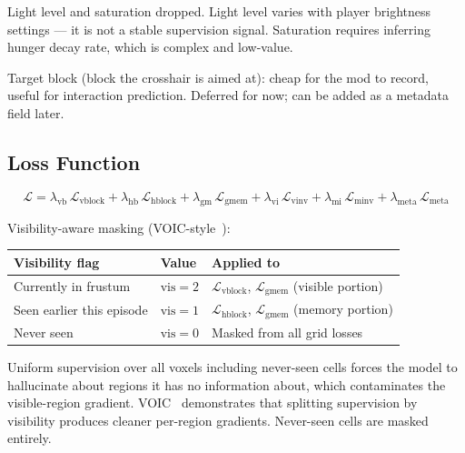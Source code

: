 \documentclass[11pt,a4paper]{article}
\begin{document}
\begin{designdecision}
Light level and saturation dropped. Light level varies with player brightness settings --- it is not a stable supervision signal. Saturation requires inferring hunger decay rate, which is complex and low-value.
\end{designdecision}

\begin{openquestion}
Target block (block the crosshair is aimed at): cheap for the mod to record, useful for interaction prediction. Deferred for now; can be added as a metadata field later.
\end{openquestion}

\subsection{Loss Function}

\[
\mathcal{L} = \lambda_\text{vb}\,\mathcal{L}_\text{vblock} + \lambda_\text{hb}\,\mathcal{L}_\text{hblock} + \lambda_\text{gm}\,\mathcal{L}_\text{gmem} + \lambda_\text{vi}\,\mathcal{L}_\text{vinv} + \lambda_\text{mi}\,\mathcal{L}_\text{minv} + \lambda_\text{meta}\,\mathcal{L}_\text{meta}
\]

Visibility-aware masking (VOIC-style~\cite{voic}):

\begin{center}
\begin{tabular}{lll}
\toprule
Visibility flag & Value & Applied to \\
\midrule
Currently in frustum & $\text{vis} = 2$ & $\mathcal{L}_\text{vblock}$, $\mathcal{L}_\text{gmem}$ (visible portion) \\
Seen earlier this episode & $\text{vis} = 1$ & $\mathcal{L}_\text{hblock}$, $\mathcal{L}_\text{gmem}$ (memory portion) \\
Never seen & $\text{vis} = 0$ & Masked from all grid losses \\
\bottomrule
\end{tabular}
\end{center}

\begin{designdecision}
Uniform supervision over all voxels including never-seen cells forces the model to hallucinate about regions it has no information about, which contaminates the visible-region gradient. VOIC~\cite{voic} demonstrates that splitting supervision by visibility produces cleaner per-region gradients. Never-seen cells are masked entirely.
\end{designdecision}
\end{document}
